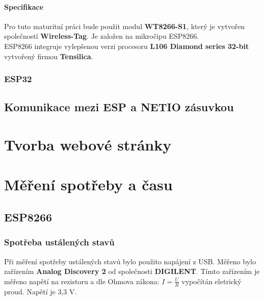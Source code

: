 \documentclass[a4paper, 12pt]{report}
\begin{document}
				\subsubsection{Specifikace}
					Pro tuto maturitní práci bude použit modul \textbf{WT8266-S1}, který je vytvořen společností \textbf{Wireless-Tag}. Je založen na mikročipu ESP8266.\\
					ESP8266 integruje vylepšenou verzi procesoru \textbf{L106 Diamond series 32-bit} vytvořený firmou \textbf{Tensilica}.

			\subsection{ESP32}
		\section{Komunikace mezi ESP a NETIO zásuvkou}

	\chapter{Tvorba webové stránky}

	\chapter{Měření spotřeby a času}
		\section{ESP8266}

			\subsection{Spotřeba ustálených stavů}
				Při měření spotřeby ustálených stavů bylo použito napájení z USB. Měřeno bylo zařízením \textbf{Analog Discovery 2} od společnosti \textbf{DIGILENT}. Tímto zařízením je měřeno napětí na rezistoru a dle Ohmova zákona: $I =\frac{U}{R}$ vypočítán eletrický proud. Napětí je 3,3 V.
\end{document}
